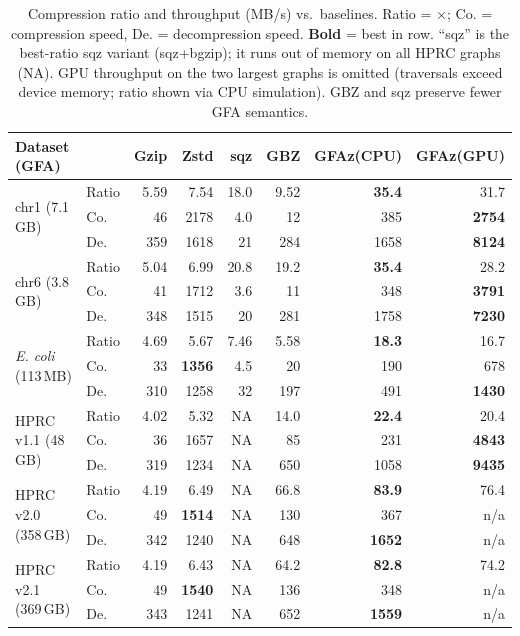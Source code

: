 \documentclass[11pt]{article}
\newcommand{\B}[1]{\textbf{#1}}
\newcommand{\gfaz}{GFAz\xspace}
\begin{document}
\begin{table}[H]
\centering
\scriptsize
\caption{Compression ratio and throughput (MB/s) vs.\ baselines. Ratio = ×; Co. =
compression speed, De. = decompression speed. \B{Bold} = best in row. ``sqz'' is the
best-ratio sqz variant (sqz+bgzip); it runs out of memory on all HPRC graphs (NA).
GPU throughput on the two largest graphs is omitted (traversals exceed device memory;
ratio shown via CPU simulation). GBZ and sqz preserve fewer GFA semantics.}
\label{tab:compress}
\setlength{\tabcolsep}{3pt}
\begin{tabular}{llrrrrrr}
\toprule
Dataset (GFA) & & Gzip & Zstd & sqz & GBZ & \gfaz(CPU) & \gfaz(GPU) \\
\midrule
\multirow{3}{*}{chr1 (7.1\,GB)}    & Ratio & 5.59 & 7.54 & 18.0 & 9.52 & \B{35.4} & 31.7 \\
                                   & Co.   & 46   & 2178 & 4.0  & 12   & 385  & \B{2754} \\
                                   & De.   & 359  & 1618 & 21   & 284  & 1658 & \B{8124} \\
\midrule
\multirow{3}{*}{chr6 (3.8\,GB)}    & Ratio & 5.04 & 6.99 & 20.8 & 19.2 & \B{35.4} & 28.2 \\
                                   & Co.   & 41   & 1712 & 3.6  & 11   & 348  & \B{3791} \\
                                   & De.   & 348  & 1515 & 20   & 281  & 1758 & \B{7230} \\
\midrule
\multirow{3}{*}{\emph{E. coli} (113\,MB)} & Ratio & 4.69 & 5.67 & 7.46 & 5.58 & \B{18.3} & 16.7 \\
                                   & Co.   & 33   & \B{1356} & 4.5 & 20 & 190 & 678 \\
                                   & De.   & 310  & 1258 & 32  & 197 & 491  & \B{1430} \\
\midrule
\multirow{3}{*}{HPRC v1.1 (48\,GB)} & Ratio & 4.02 & 5.32 & NA & 14.0 & \B{22.4} & 20.4 \\
                                   & Co.   & 36   & 1657 & NA & 85   & 231  & \B{4843} \\
                                   & De.   & 319  & 1234 & NA & 650  & 1058 & \B{9435} \\
\midrule
\multirow{3}{*}{HPRC v2.0 (358\,GB)} & Ratio & 4.19 & 6.49 & NA & 66.8 & \B{83.9} & 76.4 \\
                                   & Co.   & 49   & \B{1514} & NA & 130 & 367 & n/a \\
                                   & De.   & 342  & 1240 & NA & 648  & \B{1652} & n/a \\
\midrule
\multirow{3}{*}{HPRC v2.1 (369\,GB)} & Ratio & 4.19 & 6.43 & NA & 64.2 & \B{82.8} & 74.2 \\
                                   & Co.   & 49   & \B{1540} & NA & 136 & 348 & n/a \\
                                   & De.   & 343  & 1241 & NA & 652  & \B{1559} & n/a \\
\bottomrule
\end{tabular}
\end{table}
\end{document}
